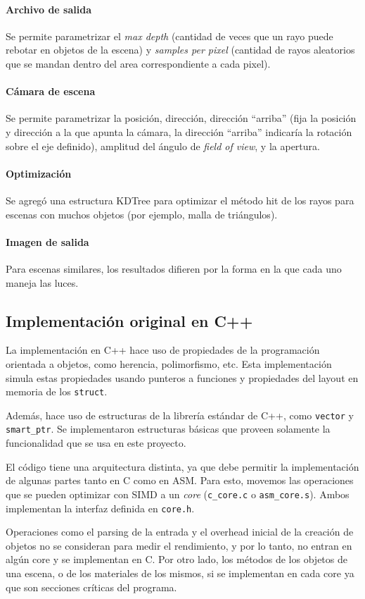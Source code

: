 \paragraph{Archivo de salida} Se permite parametrizar el \textit{max depth}
(cantidad de veces que un rayo puede rebotar en objetos de la escena) y
\textit{samples per pixel} (cantidad de rayos aleatorios que se mandan dentro
del area correspondiente a cada pixel).

\paragraph{Cámara de escena} Se permite parametrizar la posición, dirección,
dirección ``arriba'' (fija la posición y dirección a la que apunta la cámara, la
dirección ``arriba'' indicaría la rotación sobre el eje definido), amplitud del
ángulo de \textit{field of view}, y la apertura.

\paragraph{Optimización} Se agregó una estructura KDTree para optimizar el
método hit de los rayos para escenas con muchos objetos (por ejemplo, malla de
triángulos).

\paragraph{Imagen de salida} Para escenas similares, los resultados difieren por
la forma en la que cada uno maneja las luces.

\subsection{Implementación original en C++}

La implementación en C++ hace uso de propiedades de la programación orientada a
objetos, como herencia, polimorfismo, etc. Esta implementación simula estas
propiedades usando punteros a funciones y propiedades del layout en memoria de
los \texttt{struct}.

Además, hace uso de estructuras de la librería estándar de C++, como
\texttt{vector} y \texttt{smart\_ptr}. Se implementaron estructuras básicas que
proveen solamente la funcionalidad que se usa en este proyecto.

El código tiene una arquitectura distinta, ya que debe permitir la
implementación de algunas partes tanto en C como en ASM. Para esto, movemos las
operaciones que se pueden optimizar con SIMD a un \textit{core}
(\texttt{c\_core.c} o \texttt{asm\_core.s}). Ambos implementan la interfaz
definida en \texttt{core.h}.

Operaciones como el parsing de la entrada y el overhead inicial de la creación de
objetos no se consideran para medir el rendimiento, y por lo tanto, no entran en
algún core y se implementan en C. Por otro lado, los métodos de los objetos de
una escena, o de los materiales de los mismos, si se implementan en cada
core ya que son secciones críticas del programa.
